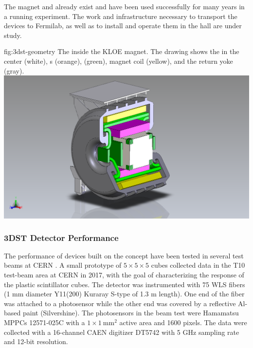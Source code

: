 The  magnet and  already exist and have been used successfully for many years in a running experiment. The work and infrastructure necessary to transport the devices to Fermilab, as well as to install and operate them in the  hall are under study.



\begin{dunefigure}{fig:3dst-geometry}
{The  inside the KLOE magnet. The drawing shows the  in the center (white), s (orange),  (green), magnet coil (yellow), and the return yoke (gray).}
  \includegraphics[width=7.in]{graphics/3DST-KLOE2019-08-01.png}
\end{dunefigure}


\subsubsection{3DST Detector Performance}

The performance of devices built on the  concept have been tested in several test beams at CERN \cite{Mineev:2018ekk}.
A small prototype of $5\times5\times5$ cubes collected data in the T10 test-beam area at CERN in 2017, with the goal of characterizing the response of the plastic scintillator cubes.
The detector was instrumented with 75 WLS fibers (1 mm diameter Y11(200) Kuraray S-type of 1.3 m length). One end of the fiber was attached to a photosensor while the other end was covered by a reflective Al-based paint (Silvershine). The photosensors in the beam test were Hamamatsu MPPCs 12571-025C with a $1\times1~\text{mm}^2$ active area and 1600 pixels. The data were collected with a 16-channel CAEN digitizer DT5742 with 5 GHz sampling rate and 12-bit resolution.


